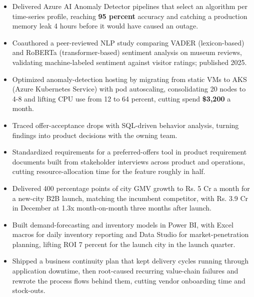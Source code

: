 \documentclass[letterpaper,10pt]{article}
\begin{document}
\begin{itemize}
\item Delivered Azure AI Anomaly Detector pipelines that select an algorithm per time-series profile, reaching \textbf{95 percent} accuracy and catching a production memory leak 4 hours before it would have caused an outage.
\item Coauthored a peer-reviewed NLP study comparing VADER (lexicon-based) and RoBERTa (transformer-based) sentiment analysis on museum reviews, validating machine-labeled sentiment against visitor ratings; published 2025.
\item Optimized anomaly-detection hosting by migrating from static VMs to AKS (Azure Kubernetes Service) with pod autoscaling, consolidating 20 nodes to 4-8 and lifting CPU use from 12 to 64 percent, cutting spend \textbf{\$3,200} a month.
\end{itemize}

\begin{itemize}
\item Traced offer-acceptance drops with SQL-driven behavior analysis, turning findings into product decisions with the owning team.
\item Standardized requirements for a preferred-offers tool in product requirement documents built from stakeholder interviews across product and operations, cutting resource-allocation time for the feature roughly in half.
\end{itemize}

\begin{itemize}
\item Delivered 400 percentage points of city GMV growth to Rs. 5 Cr a month for a new-city B2B launch, matching the incumbent competitor, with Rs. 3.9 Cr in December at 1.3x month-on-month three months after launch.
\item Built demand-forecasting and inventory models in Power BI, with Excel macros for daily inventory reporting and Data Studio for market-penetration planning, lifting ROI 7 percent for the launch city in the launch quarter.
\item Shipped a business continuity plan that kept delivery cycles running through application downtime, then root-caused recurring value-chain failures and rewrote the process flows behind them, cutting vendor onboarding time and stock-outs.
\end{itemize}
\end{document}
